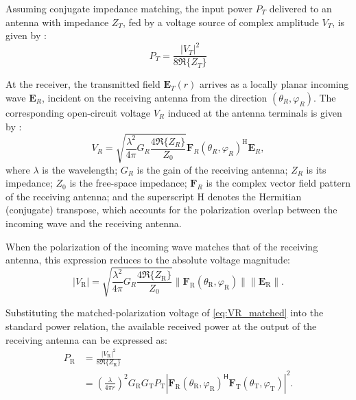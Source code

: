 Assuming conjugate impedance matching, the input power $P_T$ delivered to an antenna with impedance $Z_T$, fed by a voltage source of complex amplitude $V_T$, is given by \cite{NVIDIACorporation2026}:
\begin{equation}
P_T = \frac{|V_T|^2}{8\Re\{Z_T\}}
\end{equation}

At the receiver, the transmitted field $\mathbf{E}_T(r)$ arrives as a locally planar incoming wave $\mathbf{E}_R$, incident on the receiving antenna from the direction $(\theta_R, \varphi_R)$. The corresponding open-circuit voltage $V_R$ induced at the antenna terminals is given by \cite{NVIDIACorporation2026}:
\begin{equation}
V_R = \sqrt{\frac{\lambda^2}{4\pi} G_R \frac{4\Re\{Z_R\}}{Z_0}} \mathbf{F}_R(\theta_R, \varphi_R)^\text{H} \mathbf{E}_R,
\end{equation}
where $\lambda$ is the wavelength; $G_R$ is the gain of the receiving antenna; $Z_R$ is its impedance; $Z_0$ is the free-space impedance; $\mathbf{F}_R$ is the complex vector field pattern of the receiving antenna; and the superscript $\text{H}$ denotes the Hermitian (conjugate) transpose, which accounts for the polarization overlap between the incoming wave and the receiving antenna.

When the polarization of the incoming wave matches that of the receiving antenna, this expression reduces to the absolute voltage magnitude:
\begin{equation}
\label{eq:VR_matched}
|V_\text{R}| = \sqrt{\frac{\lambda^2}{4\pi} G_R \frac{4\Re\{Z_\text{R}\}}{Z_0}} \|\mathbf{F}_\text{R}(\theta_\text{R}, \varphi_\text{R})\| \|\mathbf{E}_\text{R}\|.
\end{equation}

Substituting the matched-polarization voltage of \eqref{eq:VR_matched} into the standard power relation, the available received power at the output of the receiving antenna can be expressed as:
\begin{align}
    P_\text{R} &= \frac{|V_\text{R}|^2}{8\Re\{Z_\text{R}\}} \\
    &= \left(\frac{\lambda}{4\pi r}\right)^2 G_\text{R} G_\text{T} P_\text{T} \left|\mathbf{F}_\text{R}(\theta_\text{R}, \varphi_\text{R})^{\mathsf{H}} \mathbf{F}_\text{T}(\theta_\text{T}, \varphi_\text{T})\right|^2.
\end{align}

